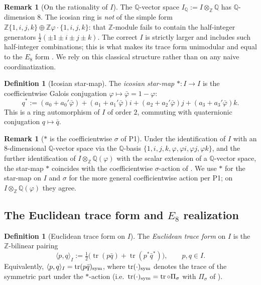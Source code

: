 \documentclass[11pt, a4paper]{amsart}
\theoremstyle{definition}
\newtheorem{definition}[theorem]{Definition}
\newtheorem{remark}[theorem]{Remark}
\newcommand{\Q}{\mathbb{Q}}
\newcommand{\Z}{\mathbb{Z}}
\newcommand{\tr}{\operatorname{tr}}
\begin{document}
\begin{remark}[On the rationality of $I$]
\label{rmk:I-rationality}
The $\Q$-vector space $I_\Q := I \otimes_\Z \Q$ has $\Q$-dimension
$8$. The icosian ring is \emph{not} of the simple form
$\Z\{1, i, j, k\} \oplus \Z\varphi \cdot \{1, i, j, k\}$: that
$\Z$-module fails to contain the half-integer generators
$\tfrac{1}{2}(\pm 1 \pm i \pm j \pm k)$. The correct $I$ is
strictly larger and includes such half-integer combinations; this
is what makes its trace form unimodular and equal to the $E_8$
form \cite[Ch.~8, Eq.~(17)]{ConwaySloane}. We rely on this
classical structure rather than on any naive coordinatization.
\end{remark}

\begin{definition}[Icosian star-map]
\label{def:icosian-star}
The \emph{icosian star-map} $\ast \colon I \to I$ is the
coefficientwise Galois conjugation
$\varphi \mapsto \bar\varphi = 1 - \varphi$:
\[
  q^\ast := (a_0 + a_0' \bar\varphi) + (a_1 + a_1' \bar\varphi) i
    + (a_2 + a_2' \bar\varphi) j + (a_3 + a_3' \bar\varphi) k.
\]
This is a ring automorphism of $I$ of order $2$, commuting with
quaternionic conjugation $q \mapsto \bar q$.
\end{definition}

\begin{remark}[$\ast$ is the coefficientwise $\sigma$ of P1]
\label{rmk:star-is-sigma}
Under the identification of $I$ with an $8$-dimensional
$\Q$-vector space via the $\Q$-basis
$\{1, i, j, k, \varphi, \varphi i, \varphi j, \varphi k\}$, and the
further identification of $I \otimes_\Z \Q(\varphi)$ with the
scalar extension of a $\Q$-vector space, the star-map $\ast$
coincides with the coefficientwise $\sigma$-action of
\cite[Def.~2.2, Def.~2.5]{SigmaRationality}. We use $\ast$ for the
star-map on $I$ and $\sigma$ for the more general coefficientwise
action per P1; on $I \otimes_\Z \Q(\varphi)$ they agree.
\end{remark}

\subsection{The Euclidean trace form and $E_8$ realization}

\begin{definition}[Euclidean trace form on $I$]
\label{def:trace-form}
The \emph{Euclidean trace form} on $I$ is the $\Z$-bilinear pairing
\[
  \langle p, q \rangle_I := \tfrac{1}{2}\big( \tr(p \bar q)
  + \tr(p^\ast \bar{q}^\ast)\big),
  \qquad p, q \in I.
\]
Equivalently, $\langle p, q \rangle_I = \tr(p\bar q)_{\rm sym}$,
where $\tr(\cdot)_{\rm sym}$ denotes the trace of the symmetric
part under the $\ast$-action (i.e.\ $\tr(\cdot)_{\rm sym} =
\tr \circ \Pi_\sigma$ with $\Pi_\sigma$ of
\cite[Def.~4.1]{SigmaRationality}).
\end{definition}
\end{document}
